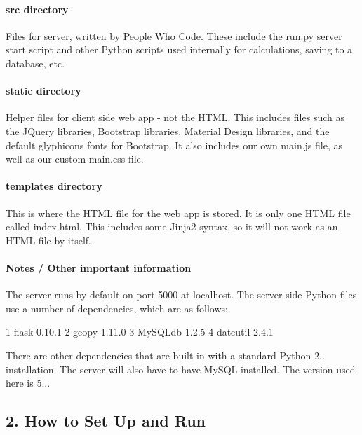 \paragraph*{{\ttfamily src} directory}

Files for server, written by People Who Code. These include the \hyperlink{run_8py}{run.\+py} server start script and other Python scripts used internally for calculations, saving to a database, etc.

\paragraph*{{\ttfamily static} directory}

Helper files for client side web app -\/ not the H\+T\+ML. This includes files such as the J\+Query libraries, Bootstrap libraries, Material Design libraries, and the default glyphicons fonts for Bootstrap. It also includes our own main.\+js file, as well as our custom main.\+css file.

\paragraph*{{\ttfamily templates} directory}

This is where the H\+T\+ML file for the web app is stored. It is only one H\+T\+ML file called {\ttfamily index.\+html}. This includes some Jinja2 syntax, so it will not work as an H\+T\+ML file by itself.

\paragraph*{Notes / Other important information}

The server runs by default on port 5000 at localhost. The server-\/side Python files use a number of dependencies, which are as follows\+:


\begin{DoxyCode}
1 flask 0.10.1
2 geopy 1.11.0
3 MySQLdb 1.2.5
4 dateutil 2.4.1
\end{DoxyCode}
 There are other dependencies that are built in with a standard Python 2.. installation. The server will also have to have My\+S\+QL installed. The version used here is 5...

\subsection*{2. How to Set Up and Run}

